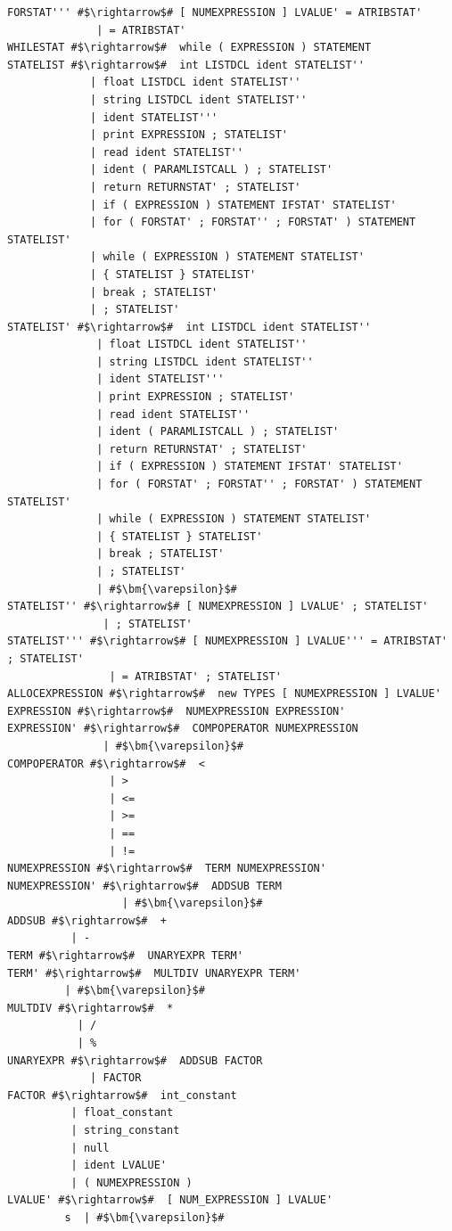 \documentclass[
	12pt,				%
	openright,			%
	twoside,			%
	a4paper,			%
	english,			%
	french,				%
	spanish,			%
	brazil				%
	]{abntex2}
\begin{document}
\begin{lstlisting}[escapechar=\#]
FORSTAT''' #$\rightarrow$# [ NUMEXPRESSION ] LVALUE' = ATRIBSTAT'
              | = ATRIBSTAT'
WHILESTAT #$\rightarrow$#  while ( EXPRESSION ) STATEMENT
STATELIST #$\rightarrow$#  int LISTDCL ident STATELIST''
             | float LISTDCL ident STATELIST''
             | string LISTDCL ident STATELIST''
             | ident STATELIST'''
             | print EXPRESSION ; STATELIST'
             | read ident STATELIST''
             | ident ( PARAMLISTCALL ) ; STATELIST'
             | return RETURNSTAT' ; STATELIST'
             | if ( EXPRESSION ) STATEMENT IFSTAT' STATELIST'
             | for ( FORSTAT' ; FORSTAT'' ; FORSTAT' ) STATEMENT STATELIST'
             | while ( EXPRESSION ) STATEMENT STATELIST'
             | { STATELIST } STATELIST'
             | break ; STATELIST'
             | ; STATELIST'
STATELIST' #$\rightarrow$#  int LISTDCL ident STATELIST''
              | float LISTDCL ident STATELIST''
              | string LISTDCL ident STATELIST''
              | ident STATELIST'''
              | print EXPRESSION ; STATELIST'
              | read ident STATELIST''
              | ident ( PARAMLISTCALL ) ; STATELIST'
              | return RETURNSTAT' ; STATELIST'
              | if ( EXPRESSION ) STATEMENT IFSTAT' STATELIST'
              | for ( FORSTAT' ; FORSTAT'' ; FORSTAT' ) STATEMENT STATELIST'
              | while ( EXPRESSION ) STATEMENT STATELIST'
              | { STATELIST } STATELIST'
              | break ; STATELIST'
              | ; STATELIST'
              | #$\bm{\varepsilon}$#
STATELIST'' #$\rightarrow$# [ NUMEXPRESSION ] LVALUE' ; STATELIST'
               | ; STATELIST'
STATELIST''' #$\rightarrow$# [ NUMEXPRESSION ] LVALUE''' = ATRIBSTAT' ; STATELIST'
                | = ATRIBSTAT' ; STATELIST'
ALLOCEXPRESSION #$\rightarrow$#  new TYPES [ NUMEXPRESSION ] LVALUE'
EXPRESSION #$\rightarrow$#  NUMEXPRESSION EXPRESSION'
EXPRESSION' #$\rightarrow$#  COMPOPERATOR NUMEXPRESSION
               | #$\bm{\varepsilon}$#
COMPOPERATOR #$\rightarrow$#  <
                | >
                | <=
                | >=
                | ==
                | !=
NUMEXPRESSION #$\rightarrow$#  TERM NUMEXPRESSION'
NUMEXPRESSION' #$\rightarrow$#  ADDSUB TERM
                  | #$\bm{\varepsilon}$#
ADDSUB #$\rightarrow$#  +
          | -
TERM #$\rightarrow$#  UNARYEXPR TERM'
TERM' #$\rightarrow$#  MULTDIV UNARYEXPR TERM'
         | #$\bm{\varepsilon}$#
MULTDIV #$\rightarrow$#  *
           | /
           | %
UNARYEXPR #$\rightarrow$#  ADDSUB FACTOR
             | FACTOR
FACTOR #$\rightarrow$#  int_constant
          | float_constant
          | string_constant
          | null
          | ident LVALUE'
          | ( NUMEXPRESSION )
LVALUE' #$\rightarrow$#  [ NUM_EXPRESSION ] LVALUE'
         s  | #$\bm{\varepsilon}$# 
\end{lstlisting}
\end{document}
